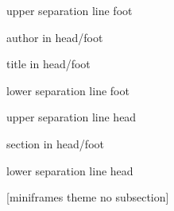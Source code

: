 \makeatletter
{}
  {%
    \begin{beamercolorbox}[colsep=1.5pt]{upper separation line foot}
    \end{beamercolorbox}
    \begin{beamercolorbox}[ht=2.5ex,dp=1.125ex,%
      leftskip=.3cm,rightskip=.3cm plus1fil]{author in head/foot}%
      \hfill%
      {\insertshortinstitute}%
    \end{beamercolorbox}%
    \begin{beamercolorbox}[ht=2.5ex,dp=1.125ex,%
      leftskip=.3cm,rightskip=.3cm plus1fil]{title in head/foot}%
      {\insertshorttitle}%
      \hfill%
      {\insertframenumber~\frameofframes~\inserttotalframenumber}
    \end{beamercolorbox}%
    \begin{beamercolorbox}[colsep=1.5pt]{lower separation line foot}
    \end{beamercolorbox}
  }
{%
  \begin{beamercolorbox}[colsep=1.5pt]{upper separation line head}
  \end{beamercolorbox}
  \begin{beamercolorbox}{section in head/foot}
    \vskip2pt\insertnavigation{\paperwidth}\vskip2pt
  \end{beamercolorbox}%
  \begin{beamercolorbox}[colsep=1.5pt]{lower separation line head}
  \end{beamercolorbox}
}

[miniframes theme no subsection]
\makeatother